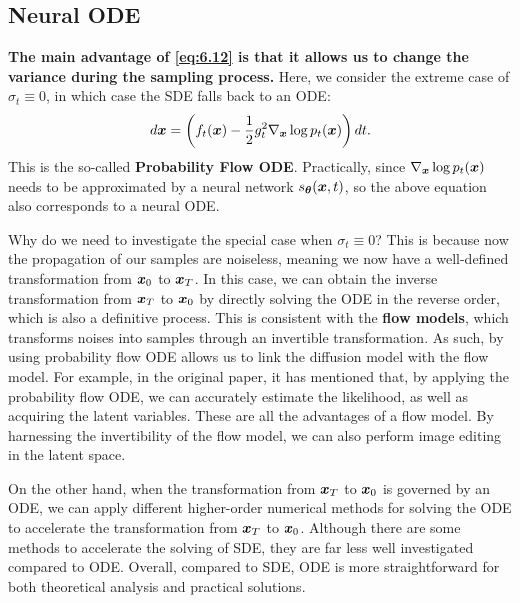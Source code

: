 \subsection{Neural ODE}
\textbf{The main advantage of \cref{eq:6.12} is that it allows us to change the variance during the sampling process.} Here, we consider the extreme case of $\sigma_t\equiv0$, in which case the SDE falls back to an ODE:
\begin{equation}
    \label{eq:6.14}
    d\bm{x}=\left(f_t(\bm{x}) -\frac{1}{2}g_t^2\nabla_{\bm{x}} \log p_t(\bm{x})\right)dt.
\end{equation}
This is the so-called \textbf{Probability Flow ODE}. Practically, since $\nabla_{\bm{x}} \log p_t(\bm{x})$ needs to be approximated by a neural network $s_{\bm{\theta}}(\bm{x},t)$, so the above equation also corresponds to a neural ODE.

Why do we need to investigate the special case when $\sigma_t\equiv0$? This is because now the propagation of our samples are noiseless, meaning we now have a well-defined transformation from $\bm{x}_0$ to $\bm{x}_T$. In this case, we can obtain the inverse transformation from $\bm{x}_T$ to $\bm{x}_0$ by directly solving the ODE in the reverse order, which is also a definitive process. This is consistent with the \textbf{flow models}, which transforms noises into samples through an invertible transformation. As such, by using probability flow ODE allows us to link the diffusion model with the flow model. For example, in the original paper\cite{song2020score}, it has mentioned that, by applying the probability flow ODE, we can accurately estimate the likelihood, as well as acquiring the latent variables. These are all the advantages of a flow model. By harnessing the invertibility of the flow model, we can also perform image editing in the latent space.

On the other hand, when the transformation from $\bm{x}_T$ to $\bm{x}_0$ is governed by an ODE, we can apply different higher-order numerical methods for solving the ODE to accelerate the transformation from $\bm{x}_T$ to $\bm{x}_0$. Although there are some methods to accelerate the solving of SDE, they are far less well investigated compared to ODE. Overall, compared to SDE, ODE is more straightforward for both theoretical analysis and practical solutions.

